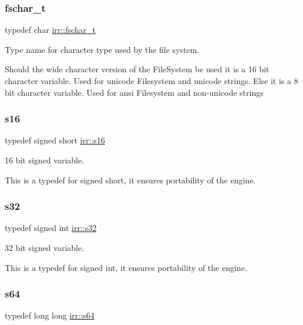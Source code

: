 \subsubsection{\texorpdfstring{fschar\+\_\+t}{fschar\_t}}
{\footnotesize\ttfamily typedef char \hyperlink{namespaceirr_a813cca9bac9fa0c1427d89720a451460}{irr\+::fschar\+\_\+t}}



Type name for character type used by the file system. 

Should the wide character version of the File\+System be used it is a 16 bit character variable. Used for unicode Filesystem and unicode strings. Else it is a 8 bit character variable. Used for ansi Filesystem and non-\/unicode strings \mbox{\label{namespaceirr_a43ace0af066371ac0862bac3f7314220}} 
\subsubsection{\texorpdfstring{s16}{s16}}
{\footnotesize\ttfamily typedef signed short \hyperlink{namespaceirr_a43ace0af066371ac0862bac3f7314220}{irr\+::s16}}



16 bit signed variable. 

This is a typedef for signed short, it ensures portability of the engine. \mbox{\label{namespaceirr_ac66849b7a6ed16e30ebede579f9b47c6}} 
\subsubsection{\texorpdfstring{s32}{s32}}
{\footnotesize\ttfamily typedef signed int \hyperlink{namespaceirr_ac66849b7a6ed16e30ebede579f9b47c6}{irr\+::s32}}



32 bit signed variable. 

This is a typedef for signed int, it ensures portability of the engine. \mbox{\label{namespaceirr_abf54bd535f8d4dd996270e68c3ad8c08}} 
\subsubsection{\texorpdfstring{s64}{s64}}
{\footnotesize\ttfamily typedef long long \hyperlink{namespaceirr_abf54bd535f8d4dd996270e68c3ad8c08}{irr\+::s64}}



